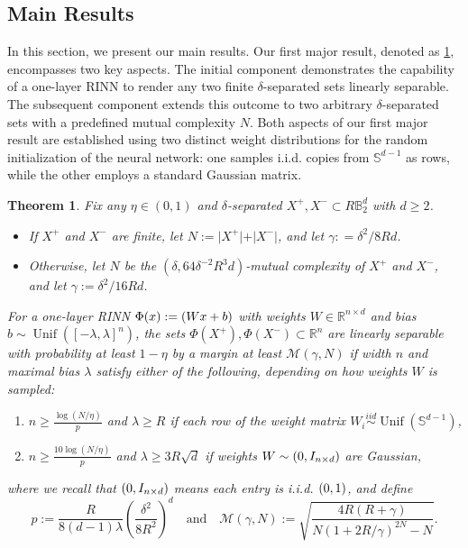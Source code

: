 \documentclass[aoap]{imsart}
\numberwithin{equation}{section}
\newtheorem{theorem}{Theorem}[section]
\theoremstyle{definition}
\theoremstyle{remark}
\newcommand{\N}{\mathbb{N}}
\newcommand{\R}{\mathbb{R}} %
\numberwithin{equation}{section}
\renewcommand{\S}{\mathbb{S}}
\newcommand{\0}{\mathbf{0}}
\newcommand{\1}{\mathbf{1}}
\newcommand{\B}{\mathbb{B}}
\renewcommand{\S}{\mathbb{S}}
\newcommand{\iid}{\stackrel{iid}{\sim}}
\DeclareMathOperator{\Unif}{Unif}
\let \Re \relax
\DeclareMathOperator{\Re}{ReLU}
\let \N \relax
\DeclareMathOperator{\N}{N}
\numberwithin{equation}{section}
\begin{document}
\subsection{Main Results}
In this section, we present our main results. Our first major result, denoted as \cref{thm:main}, encompasses two key aspects. The initial component demonstrates the capability of a one-layer RINN to render any two finite $\delta$-separated sets linearly separable. The subsequent component extends this outcome to two arbitrary $\delta$-separated sets with a predefined mutual complexity $N$. Both aspects of our first major result are established using two distinct weight distributions for the random initialization of the neural network: one samples i.i.d. copies from $\S^{d-1}$ as rows, while the other employs a standard Gaussian matrix.


\begin{theorem}\label{thm:main}
Fix any $\eta \in (0, 1)$ and $\delta$-separated $X^{+}, X^{-}\subset R\B_{2}^{d}$ with $d\geq 2$.
\begin{itemize}
	\item If $X^+$ and $X^-$ are finite, let $N:=\vert X^{+}\vert +\vert X^{-}\vert$, and let $\gamma: =\delta^{2}/8Rd$.
	\item Otherwise, let $N$ be the $(\delta, 64\delta^{-2}R^{3}d)$-mutual complexity of $X^+$ and $X^-$, and let $\gamma:= \delta^2/16Rd$.
\end{itemize}
For a one-layer RINN $\Phi(x):=\Re(Wx+b)$ with weights $W\in\R^{n\times d}$ and bias $b\sim \Unif\left([-\lambda, \lambda]^n\right)$, the sets $\Phi(X^{+}), \Phi (X^{-})\subset\R^{n}$ are linearly separable with probability at least $1-\eta$ by a margin at least $\mathcal{M}(\gamma,N)$ if width $n$ and maximal bias $\lambda$ satisfy either of the following, depending on how weights $W$ is sampled:
\begin{enumerate}
\item[(i)] $n\geq \frac{\log (N/\eta)}{p}$ and $\lambda\geq R$ if each row of the weight matrix $W_i\iid \Unif(\S^{d-1})$,
\item[(ii)] $n\geq \frac{10\log (N/\eta)}{p}$ and $\lambda\geq 3R\sqrt{d}$ if weights $W\sim \N(0, I_{n\times d})$ are Gaussian,
\end{enumerate}
where we recall that $\N(0, I_{n\times d})$ means each entry is i.i.d. $\N(0, 1)$, and define
\begin{equation}\label{eq:p}
p:=\frac{R}{8(d-1)\lambda}\left(\frac{\delta^{2}}{8R^{2}}\right)^{d}\quad\text{and}\quad\mathcal{M}(\gamma,N):=\sqrt{\frac{4R(R+\gamma)}{N(1+2R/\gamma)^{2N}-N}}.
\end{equation} 
\end{theorem}
\end{document}
